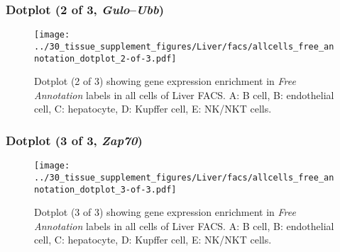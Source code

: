 \clearpage

\subsubsection{Dotplot (2 of 3, \emph{Gulo}--\emph{Ubb})}
\begin{figure}[h]
\centering
\texttt{[image: ../30\_tissue\_supplement\_figures/Liver/facs/allcells\_free\_annotation\_dotplot\_2-of-3.pdf]}

\caption{ Dotplot (2 of 3)  showing gene expression enrichment in \emph{Free Annotation} labels in all cells of Liver FACS. A: B cell, B: endothelial cell, C: hepatocyte, D: Kupffer cell, E: NK/NKT cells.}
\end{figure}


\clearpage

\subsubsection{Dotplot (3 of 3, \emph{Zap70})}
\begin{figure}[h]
\centering
\texttt{[image: ../30\_tissue\_supplement\_figures/Liver/facs/allcells\_free\_annotation\_dotplot\_3-of-3.pdf]}

\caption{ Dotplot (3 of 3)  showing gene expression enrichment in \emph{Free Annotation} labels in all cells of Liver FACS. A: B cell, B: endothelial cell, C: hepatocyte, D: Kupffer cell, E: NK/NKT cells.}
\end{figure}

